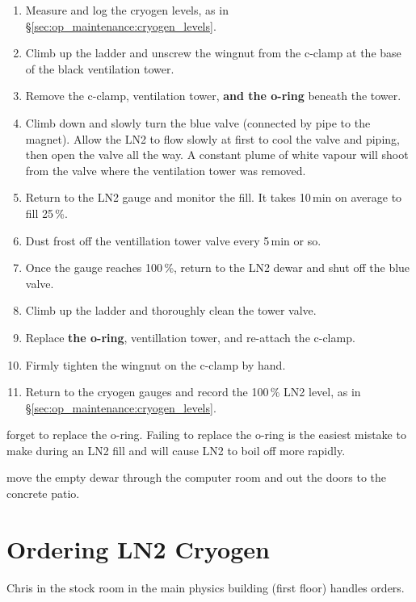 \begin{enumerate}
\item Measure and log the cryogen levels, as in \S\ref{sec:op_maintenance:cryogen_levels}.
\item Climb up the ladder and unscrew the wingnut from the c-clamp at the base of the black ventilation tower.
\item Remove the c-clamp, ventilation tower, \textbf{and the o-ring} beneath the tower.
\item Climb down and slowly turn the blue valve (connected by pipe to the magnet).  Allow the LN2 to flow slowly at first to cool the valve and piping, then open the valve all the way.  A constant plume of white vapour will shoot from the valve where the ventilation tower was removed.
\item Return to the LN2 gauge and monitor the fill. It takes 10\,min on average to fill 25\,\%.
\item Dust frost off the ventillation tower valve every 5\,min or so.
\item Once the gauge reaches 100\,\%, return to the LN2 dewar and shut off the blue valve.
\item Climb up the ladder and thoroughly clean the tower valve.
\item Replace \textbf{the o-ring}, ventillation tower, and re-attach the c-clamp.
\item Firmly tighten the wingnut on the c-clamp by hand.
\item Return to the cryogen gauges and record the 100\,\% LN2 level, as in \S\ref{sec:op_maintenance:cryogen_levels}.
\end{enumerate}

\begin{pleasedonot} forget to replace the o-ring.  Failing to replace the o-ring is the easiest mistake to make during an LN2 fill and will cause LN2 to boil off more rapidly. \end{pleasedonot}

\begin{pleasedo} move the empty dewar through the computer room and out the doors to the concrete patio. \end{pleasedo}

\section{Ordering LN2 Cryogen}
\label{sec:op_maintenance:ordering_ln2}

Chris in the stock room in the main physics building (first floor) handles orders.

